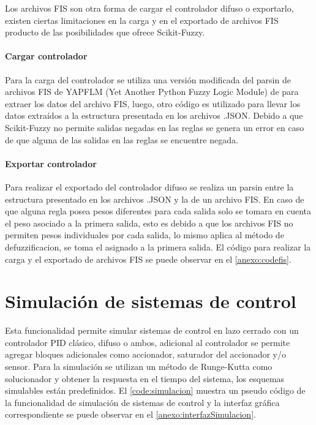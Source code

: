             Los archivos FIS son otra forma de cargar el controlador difuso o exportarlo, existen ciertas limitaciones en la carga y en el exportado de archivos FIS producto de las posibilidades que ofrece Scikit-Fuzzy.    

            \paragraph{Cargar controlador}
            
                 Para la carga del controlador se utiliza una versión modificada del parsin de archivos FIS de YAPFLM (Yet Another Python Fuzzy Logic Module) de \textcite{sputnick1124} para extraer los datos del archivo FIS, luego, otro código es utilizado para llevar los datos extraídos a la estructura presentada en los archivos .JSON. Debido a que Scikit-Fuzzy no permite salidas negadas en las reglas se genera un error en caso de que alguna de las salidas en las reglas se encuentre negada.
            
            \paragraph{Exportar controlador}

                Para realizar el exportado del controlador difuso se realiza un parsin entre la estructura presentado en los archivos .JSON y la de un archivo FIS. En caso de que alguna regla posea pesos diferentes para cada salida solo se tomara en cuenta el peso asociado a la primera salida, esto es debido a que los archivos FIS no permiten pesos individuales por cada salida, lo mismo aplica al método de defuzzificacion, se toma el asignado a la primera salida. El código para realizar la carga y el exportado de archivos FIS se puede observar en el \ref{anexo:codefis}.

\section{Simulación de sistemas de control}

    Esta funcionalidad permite simular sistemas de control en lazo cerrado con un controlador PID clásico, difuso o ambos, adicional al controlador se permite agregar bloques adicionales como accionador, saturador del accionador y/o sensor. Para la simulación se utilizan un método de Runge-Kutta como solucionador y obtener la respuesta en el tiempo del sistema, los esquemas simulables están predefinidos. El \cref{code:simulacion} muestra un pseudo código de la funcionalidad de simulación de sistemas de control y la interfaz gráfica correspondiente se puede observar en el \ref{anexo:interfazSimulacion}.

